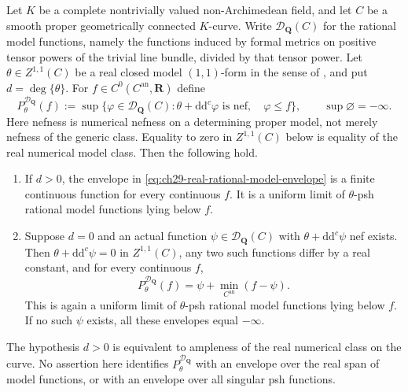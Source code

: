 \begin{theorem}
\label{thm:ch29-real-class-curve-model-envelope}
Let $K$ be a complete nontrivially valued non-Archimedean field, and let
$C$ be a smooth proper geometrically connected $K$-curve.  Write
$\mathcal D_{\mathbf Q}(C)$ for the rational model functions, namely the
functions induced by formal metrics on positive tensor powers of the
trivial line bundle, divided by that tensor power.  Let
$\theta\in Z^{1,1}(C)$ be a real closed model $(1,1)$-form in the sense of
\cite[\S\S2.3--2.7]{GJKM19}, and put $d=\deg\{\theta\}$.
For $f\in C^0(C^{\mathrm{an}},\mathbf R)$ define
\begin{equation}
\label{eq:ch29-real-rational-model-envelope}
 P^{\mathcal D_{\mathbf Q}}_\theta(f)
 :=\sup\{\varphi\in\mathcal D_{\mathbf Q}(C):
             \theta+\mathrm d\mathrm d^c\varphi\text{ is nef},\quad
             \varphi\leq f\},
 \qquad \sup\varnothing=-\infty.
\end{equation}
Here nefness is numerical nefness on a determining proper model, not
merely nefness of the generic class.  Equality to zero in
\(Z^{1,1}(C)\) below is equality of the real numerical model class.
Then the following hold.
\begin{enumerate}
\item If $d>0$, the envelope in
\eqref{eq:ch29-real-rational-model-envelope} is a finite continuous function
for every continuous $f$.  It is a uniform limit of $\theta$-psh rational
model functions lying below $f$.
\item Suppose $d=0$ and an actual function
$\psi\in\mathcal D_{\mathbf Q}(C)$ with
$\theta+\mathrm d\mathrm d^c\psi$ nef exists.  Then
$\theta+\mathrm d\mathrm d^c\psi=0$ in $Z^{1,1}(C)$, any two such
functions differ by a real constant, and for every continuous $f$,
\begin{equation}
\label{eq:ch29-real-degree-zero-envelope}
 P^{\mathcal D_{\mathbf Q}}_\theta(f)
       =\psi+\min_{C^{\mathrm{an}}}(f-\psi).
\end{equation}
This is again a uniform limit of $\theta$-psh rational model functions
lying below $f$.  If no such $\psi$ exists, all these envelopes equal
$-\infty$.
\end{enumerate}
The hypothesis $d>0$ is equivalent to ampleness of the real numerical
class on the curve.  No assertion here identifies
$P^{\mathcal D_{\mathbf Q}}_\theta$ with an envelope over the real span
of model functions, or with an envelope over all singular psh functions.
\end{theorem}


